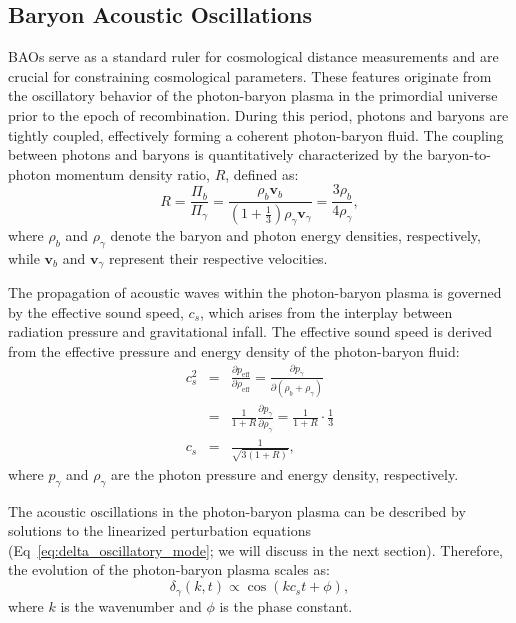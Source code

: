 \subsection{Baryon Acoustic Oscillations}
BAOs serve as a standard ruler for cosmological distance measurements and are crucial for constraining cosmological parameters. These features originate from the oscillatory behavior of the photon-baryon plasma in the primordial universe prior to the epoch of recombination. During this period, photons and baryons are tightly coupled, effectively forming a coherent photon-baryon fluid. The coupling between photons and baryons is quantitatively characterized by the baryon-to-photon momentum density ratio, \( R \), defined as:
\begin{equation}
    R = \frac{\Pi_b}{\Pi_\gamma} = \frac{\rho_b \mathbf{v}_b}{\left(1 + \frac{1}{3}\right) \rho_\gamma \mathbf{v}_\gamma} = \frac{3 \rho_b}{4 \rho_\gamma},
\end{equation}
where \( \rho_b \) and \( \rho_\gamma \) denote the baryon and photon energy densities, respectively, while \( \mathbf{v}_b \) and \( \mathbf{v}_\gamma \) represent their respective velocities. 

The propagation of acoustic waves within the photon-baryon plasma is governed by the effective sound speed, \( c_s \), which arises from the interplay between radiation pressure and gravitational infall. The effective sound speed is derived from the effective pressure and energy density of the photon-baryon fluid:
\begin{eqnarray}
    c_s^2 &=& \frac{\partial p_\mathrm{eff}}{\partial \rho_\mathrm{eff}} = \frac{\partial p_\gamma}{\partial (\rho_b + \rho_\gamma)} \nonumber \\
    &=& \frac{1}{1 + R} \frac{\partial p_\gamma}{\partial \rho_\gamma} = \frac{1}{1 + R} \cdot \frac{1}{3} \nonumber \\
    c_s &=& \frac{1}{\sqrt{3(1 + R)}},
\end{eqnarray}
where \( p_\gamma \) and \( \rho_\gamma \) are the photon pressure and energy density, respectively. 

The acoustic oscillations in the photon-baryon plasma can be described by solutions to the linearized perturbation equations (Eq~\eqref{eq:delta_oscillatory_mode}; we will discuss in the next section). 
Therefore, the evolution of the photon-baryon plasma scales as:
\begin{equation}
    \delta_\gamma(k, t) \propto \cos(k c_s t + \phi),
    \label{eq:gamma_oscillations}
\end{equation}
where \( k \) is the wavenumber and \( \phi \) is the phase constant. 

